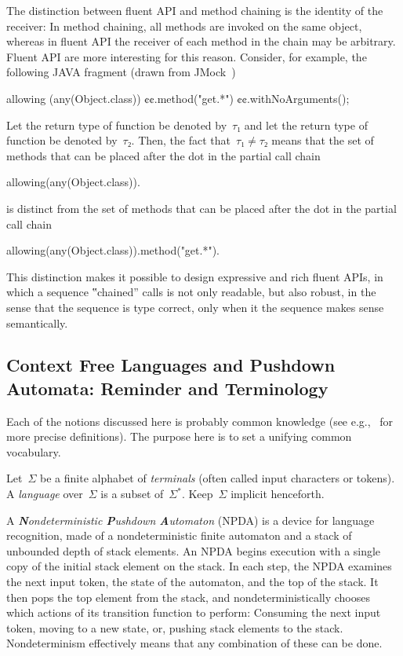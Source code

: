 The distinction between fluent API and method chaining is the identity of the receiver:
In method chaining, all methods are invoked on the same object, whereas in fluent API
  the receiver of each method in the chain may be arbitrary.
Fluent API are more interesting for this reason.
Consider, for example, the following JAVA fragment (drawn from JMock~\cite{Freeman:Pryce:06})
\begin{JAVA}
allowing (any(Object.class))
  ¢¢.method("get.*")
  ¢¢.withNoArguments();
\end{JAVA}
Let the return type of function  be denoted by~$τ₁$ and let the
  return type of function  be denoted by~$τ₂$.
Then, the fact that~$τ₁≠τ₂$ means that the set of methods that can be placed after the dot
  in the partial call chain
\begin{JAVA}
allowing(any(Object.class)).
\end{JAVA}
is distinct from the set of methods that can be placed after the dot in the partial call chain
\begin{JAVA}
allowing(any(Object.class)).method("get.*").
\end{JAVA}
This distinction makes it possible to design expressive and rich fluent APIs, in which a
  sequence ‟chained” calls is not only readable, but also robust, in the sense that the
  sequence is type correct, only when it the sequence makes sense semantically.

\subsection{Context Free Languages and Pushdown Automata: Reminder and Terminology}
Each of the notions discussed here is probably common knowledge
 (see e.g.,~\cite{Hopcroft:book:2001,Linz:2001} for more precise definitions).
The purpose here is to set a unifying common vocabulary.

Let~$Σ$ be a finite alphabet of \emph{terminals} (often called input characters or tokens).
A \emph{language} over~$Σ$
  is a subset of~$Σ^*$.
Keep~$Σ$ implicit henceforth.

A \emph{\textbf Nondeterministic \textbf Pushdown \textbf Automaton} (NPDA) is a device for language recognition,
  made of a nondeterministic finite automaton
  and a stack of unbounded depth of stack elements.
An NPDA begins execution with a single copy of the initial stack element on the stack.
In each step, the NPDA
  examines the next input token,
  the state of the automaton,
  and the top of the stack.
It then pops the top element from the stack, and nondeterministically chooses which actions of
  its transition function to perform:
  Consuming the next input token,
  moving to a new state,
  or, pushing stack elements to the stack.
Nondeterminism effectively means
  that any combination of these can be done.

